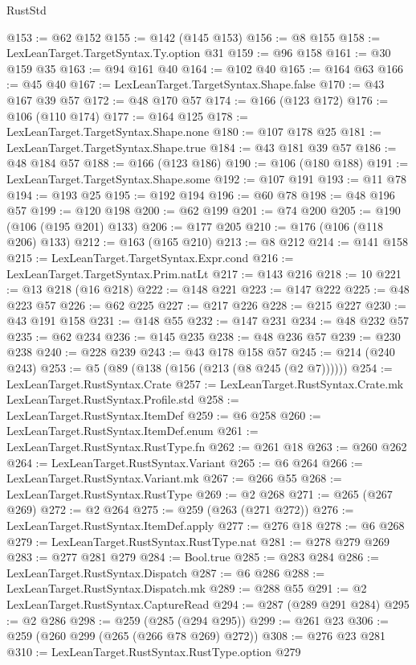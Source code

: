 \begin{lexlean}{RustStd}
\begin{coremodule}
{\begin{coremodule}
{{{{{{{{{@153 := @62 @152
@155 := @142 (@145 @153)
@156 := @8 @155
@158 := LexLeanTarget.TargetSyntax.Ty.option @31
@159 := @96 @158
@161 := @30 @159 @35
@163 := @94 @161 @40
@164 := @102 @40
@165 := @164 @63
@166 := @45 @40
@167 := LexLeanTarget.TargetSyntax.Shape.false
@170 := @43 @167 @39 @57
@172 := @48 @170 @57
@174 := @166 (@123 @172)
@176 := @106 (@110 @174)
@177 := @164 @125
@178 := LexLeanTarget.TargetSyntax.Shape.none
@180 := @107 @178 @25
@181 := LexLeanTarget.TargetSyntax.Shape.true
@184 := @43 @181 @39 @57
@186 := @48 @184 @57
@188 := @166 (@123 @186)
@190 := @106 (@180 @188)
@191 := LexLeanTarget.TargetSyntax.Shape.some
@192 := @107 @191
@193 := @11 @78
@194 := @193 @25
@195 := @192 @194
@196 := @60 @78
@198 := @48 @196 @57
@199 := @120 @198
@200 := @62 @199
@201 := @74 @200
@205 := @190 (@106 (@195 @201) @133)
@206 := @177 @205
@210 := @176 (@106 (@118 @206) @133)
@212 := @163 (@165 @210)
@213 := @8 @212
@214 := @141 @158
@215 := LexLeanTarget.TargetSyntax.Expr.cond
@216 := LexLeanTarget.TargetSyntax.Prim.natLt
@217 := @143 @216
@218 := 10
@221 := @13 @218 (@16 @218)
@222 := @148 @221
@223 := @147 @222
@225 := @48 @223 @57
@226 := @62 @225
@227 := @217 @226
@228 := @215 @227
@230 := @43 @191 @158
@231 := @148 @55
@232 := @147 @231
@234 := @48 @232 @57
@235 := @62 @234
@236 := @145 @235
@238 := @48 @236 @57
@239 := @230 @238
@240 := @228 @239
@243 := @43 @178 @158 @57
@245 := @214 (@240 @243)
@253 := @5 (@89 (@138 (@156 (@213 (@8 @245 (@2 @7))))))
@254 := LexLeanTarget.RustSyntax.Crate
@257 := LexLeanTarget.RustSyntax.Crate.mk LexLeanTarget.RustSyntax.Profile.std
@258 := LexLeanTarget.RustSyntax.ItemDef
@259 := @6 @258
@260 := LexLeanTarget.RustSyntax.ItemDef.enum
@261 := LexLeanTarget.RustSyntax.RustType.fn
@262 := @261 @18
@263 := @260 @262
@264 := LexLeanTarget.RustSyntax.Variant
@265 := @6 @264
@266 := LexLeanTarget.RustSyntax.Variant.mk
@267 := @266 @55
@268 := LexLeanTarget.RustSyntax.RustType
@269 := @2 @268
@271 := @265 (@267 @269)
@272 := @2 @264
@275 := @259 (@263 (@271 @272))
@276 := LexLeanTarget.RustSyntax.ItemDef.apply
@277 := @276 @18
@278 := @6 @268
@279 := LexLeanTarget.RustSyntax.RustType.nat
@281 := @278 @279 @269
@283 := @277 @281 @279
@284 := Bool.true
@285 := @283 @284
@286 := LexLeanTarget.RustSyntax.Dispatch
@287 := @6 @286
@288 := LexLeanTarget.RustSyntax.Dispatch.mk
@289 := @288 @55
@291 := @2 LexLeanTarget.RustSyntax.CaptureRead
@294 := @287 (@289 @291 @284)
@295 := @2 @286
@298 := @259 (@285 (@294 @295))
@299 := @261 @23
@306 := @259 (@260 @299 (@265 (@266 @78 @269) @272))
@308 := @276 @23 @281
@310 := LexLeanTarget.RustSyntax.RustType.option @279
}}}}}}}}}
\end{coremodule}}
\end{coremodule}
\end{lexlean}
